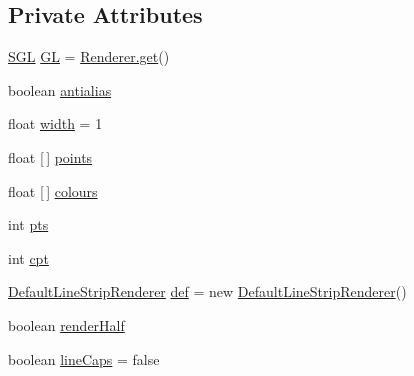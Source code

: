 \subsection*{Private Attributes}
\begin{DoxyCompactItemize}
\item 
\mbox{\hyperlink{interfaceorg_1_1newdawn_1_1slick_1_1opengl_1_1renderer_1_1_s_g_l}{S\+GL}} \mbox{\hyperlink{classorg_1_1newdawn_1_1slick_1_1opengl_1_1renderer_1_1_quad_based_line_strip_renderer_ab36a5a8e7bcb8704c798871b732b0ca5}{GL}} = \mbox{\hyperlink{classorg_1_1newdawn_1_1slick_1_1opengl_1_1renderer_1_1_renderer_abe742c3a7dfca67c6c01821d27087308}{Renderer.\+get}}()
\item 
boolean \mbox{\hyperlink{classorg_1_1newdawn_1_1slick_1_1opengl_1_1renderer_1_1_quad_based_line_strip_renderer_a9da96cac3374734801a36209293b72fe}{antialias}}
\item 
float \mbox{\hyperlink{classorg_1_1newdawn_1_1slick_1_1opengl_1_1renderer_1_1_quad_based_line_strip_renderer_a2ea1970be2e402b69b69f7cefbf41c52}{width}} = 1
\item 
float \mbox{[}$\,$\mbox{]} \mbox{\hyperlink{classorg_1_1newdawn_1_1slick_1_1opengl_1_1renderer_1_1_quad_based_line_strip_renderer_adeb4716a8ddb005cec7c3cc2ed9042e3}{points}}
\item 
float \mbox{[}$\,$\mbox{]} \mbox{\hyperlink{classorg_1_1newdawn_1_1slick_1_1opengl_1_1renderer_1_1_quad_based_line_strip_renderer_a24d42d1121b6b8a54d57edd8e972bfd0}{colours}}
\item 
int \mbox{\hyperlink{classorg_1_1newdawn_1_1slick_1_1opengl_1_1renderer_1_1_quad_based_line_strip_renderer_afcf702f11fc3763295d93ea643de7c94}{pts}}
\item 
int \mbox{\hyperlink{classorg_1_1newdawn_1_1slick_1_1opengl_1_1renderer_1_1_quad_based_line_strip_renderer_a012fbc27fca867f55b95a6aa917312bb}{cpt}}
\item 
\mbox{\hyperlink{classorg_1_1newdawn_1_1slick_1_1opengl_1_1renderer_1_1_default_line_strip_renderer}{Default\+Line\+Strip\+Renderer}} \mbox{\hyperlink{classorg_1_1newdawn_1_1slick_1_1opengl_1_1renderer_1_1_quad_based_line_strip_renderer_ace068cf3ac38fc9ef4a9025096fb3279}{def}} = new \mbox{\hyperlink{classorg_1_1newdawn_1_1slick_1_1opengl_1_1renderer_1_1_default_line_strip_renderer}{Default\+Line\+Strip\+Renderer}}()
\item 
boolean \mbox{\hyperlink{classorg_1_1newdawn_1_1slick_1_1opengl_1_1renderer_1_1_quad_based_line_strip_renderer_a1d022caff835fe4060ee76cb1079c11f}{render\+Half}}
\item 
boolean \mbox{\hyperlink{classorg_1_1newdawn_1_1slick_1_1opengl_1_1renderer_1_1_quad_based_line_strip_renderer_ace776b7bf8f22bedc9c3cb99e1603116}{line\+Caps}} = false
\end{DoxyCompactItemize}


